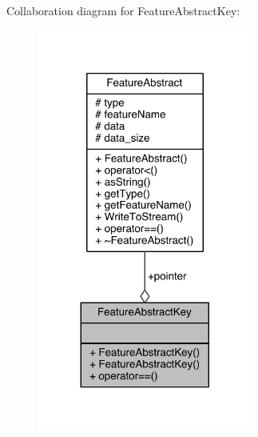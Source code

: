 Collaboration diagram for Feature\+Abstract\+Key\+:\nopagebreak
\begin{figure}[H]
\begin{center}
\leavevmode
\includegraphics[width=200pt]{class_feature_abstract_key__coll__graph}
\end{center}
\end{figure}


